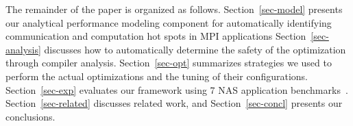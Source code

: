 The remainder of the paper is organized as follows.
Section~\ref{sec-model} presents our analytical performance modeling
component for automatically identifying communication and computation
hot spots in MPI applications Section~\ref{sec-analysis} discusses how
to automatically determine the safety of the optimization through
compiler analysis.  Section~\ref{sec-opt} summarizes strategies we
used to perform the actual optimizations and the tuning of their
configurations.  Section~\ref{sec-exp} evaluates our framework using 7
NAS application benchmarks~\cite{npb}.  Section~\ref{sec-related}
discusses related work, and Section~\ref{sec-concl} presents our
conclusions.
